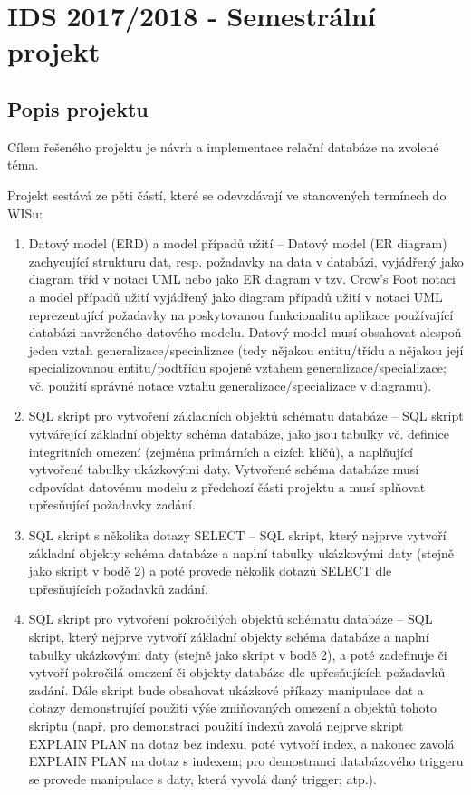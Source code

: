 \documentclass[11pt, a4paper, titlepage]{article}
\begin{document}
\section*{IDS 2017/2018 - Semestrální projekt}
\bigskip


\subsection*{Popis projektu}

Cílem řešeného projektu je návrh a implementace relační databáze na zvolené téma.

Projekt sestává ze pěti částí, které se odevzdávají ve stanovených termínech do WISu:

\begin{enumerate}
	\item Datový model (ERD) a model případů užití – Datový model (ER diagram) zachycující strukturu dat, resp. požadavky na data v databázi, vyjádřený jako diagram tříd v notaci UML nebo jako ER diagram v tzv. Crow's Foot notaci a model případů užití vyjádřený jako diagram případů užití v notaci UML reprezentující požadavky na poskytovanou funkcionalitu aplikace používající databázi navrženého datového modelu. Datový model musí obsahovat alespoň jeden vztah generalizace/specializace (tedy nějakou entitu/třídu a nějakou její specializovanou entitu/podtřídu spojené vztahem generalizace/specializace; vč. použití správné notace vztahu generalizace/specializace v diagramu).

	\item SQL skript pro vytvoření základních objektů schématu databáze – SQL skript vytvářející základní objekty schéma databáze, jako jsou tabulky vč. definice integritních omezení (zejména primárních a cizích klíčů), a naplňující vytvořené tabulky ukázkovými daty. Vytvořené schéma databáze musí odpovídat datovému modelu z předchozí části projektu a musí splňovat upřesňující požadavky zadání.

	\item SQL skript s několika dotazy SELECT – SQL skript, který nejprve vytvoří základní objekty schéma databáze a naplní tabulky ukázkovými daty (stejně jako skript v bodě 2) a poté provede několik dotazů SELECT dle upřesňujících požadavků zadání.

	\item SQL skript pro vytvoření pokročilých objektů schématu databáze – SQL skript, který nejprve vytvoří základní objekty schéma databáze a naplní tabulky ukázkovými daty (stejně jako skript v bodě 2), a poté zadefinuje či vytvoří pokročilá omezení či objekty databáze dle upřesňujících požadavků zadání. Dále skript bude obsahovat ukázkové příkazy manipulace dat a dotazy demonstrující použití výše zmiňovaných omezení a objektů tohoto skriptu (např. pro demonstraci použití indexů zavolá nejprve skript EXPLAIN PLAN na dotaz bez indexu, poté vytvoří index, a nakonec zavolá EXPLAIN PLAN na dotaz s indexem; pro demostranci databázového triggeru se provede manipulace s daty, která vyvolá daný trigger; atp.).


\end{enumerate}
\end{document}
